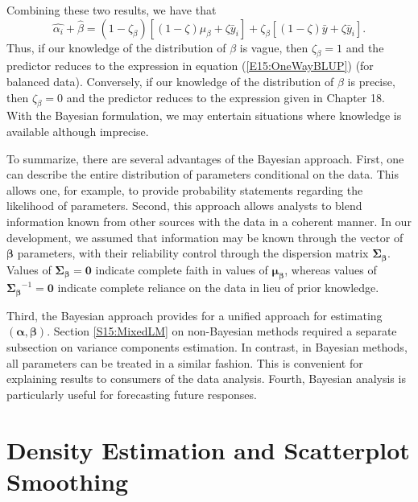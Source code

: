 Combining these two results, we have that
\begin{equation*}
\hat{\alpha_i} +\hat{\beta} = (1-\zeta_{\beta}) \left[ (1-\zeta)
\mu_{\beta} + \zeta \bar{y}_i \right] + \zeta_{\beta} \left[
(1-\zeta)\bar{y} + \zeta\bar{y}_i \right] .
\end{equation*}
Thus, if our knowledge of the distribution of $\beta$ is vague, then
$\zeta_{\beta} =1$ and the predictor reduces to the expression in
equation (\ref{E15:OneWayBLUP}) (for balanced data). Conversely, if
our knowledge of the distribution of $\beta$ is precise, then
$\zeta_{\beta} =0$ and the predictor reduces to the expression given
in Chapter 18. With the Bayesian formulation, we may entertain
situations where knowledge is available although imprecise.

\linejed

To summarize, there are several advantages of the Bayesian approach.
First, one can describe the entire distribution of parameters
conditional on the data. This allows one, for example, to provide
probability statements regarding the likelihood of parameters.
Second, this approach allows analysts to blend information known
from other sources with the data in a coherent manner. In our
development, we assumed that information may be known through the
vector of $\boldsymbol \beta$ parameters, with their reliability
control through the dispersion matrix $\boldsymbol{\Sigma
_{\beta}}$. Values of $\boldsymbol{\Sigma _{\beta}}=\mathbf{0}$
indicate complete faith in values of $\boldsymbol{\mu _{\beta}}$,
whereas values of $\boldsymbol{\Sigma _{\beta}}^{-1}=\mathbf{0}$
indicate complete reliance on the data in lieu of prior knowledge.

Third, the Bayesian approach provides for a unified approach for
estimating $(\boldsymbol \alpha, \boldsymbol \beta)$. Section
\ref{S15:MixedLM} on non-Bayesian methods required a separate
subsection on variance components estimation. In contrast, in
Bayesian methods, all parameters can be treated in a similar
fashion. This is convenient for explaining results to consumers of
the data analysis. Fourth, Bayesian analysis is particularly useful
for forecasting future responses.


\section{Density Estimation and Scatterplot Smoothing}\label{S15:Density}


